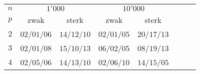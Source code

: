 \begin{tabular}{cccccccc}
\toprule
$n$&\multicolumn{2}{c}{$1'000$}&\multicolumn{2}{c}{$10'000$}\\
$p$&zwak&sterk&zwak&sterk\\\midrule
$2$&$02$/$01$/$06$&$14$/$12$/$10$&$02$/$01$/$05$&$20$/$17$/$13$\\
$3$&$02$/$01$/$08$&$15$/$10$/$13$&$06$/$02$/$05$&$08$/$19$/$13$\\
$4$&$02$/$05$/$06$&$14$/$13$/$10$&$02$/$06$/$10$&$14$/$15$/$05$\\
\bottomrule
\end{tabular}